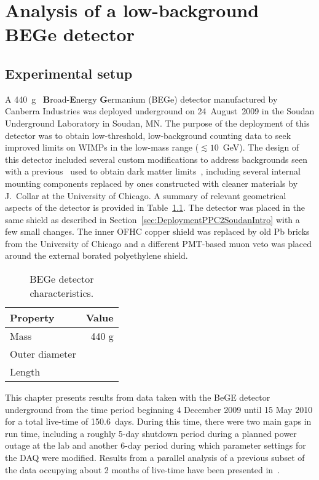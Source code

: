 \chapter{Analysis of a low-background BEGe detector}
\label{chap:AnalysisBeGe}
	\section{Experimental setup}
	\label{sec:BeGeExperimentalSetup}

A 440~g \ppc~\textbf{B}road-\textbf{E}nergy \textbf{G}ermanium (BEGe) detector manufactured by Canberra Industries was deployed underground on 24~August~2009 in the Soudan Underground Laboratory in Soudan, MN.  The purpose of the deployment of this detector was to obtain low-threshold, low-background counting data to seek improved limits on WIMPs in the low-mass range ($\lesssim10$~GeV).  The design of this detector included several custom modifications to address backgrounds seen with a previous \ppc~used to obtain dark matter limits~\cite{Aalseth:2008aa}, including several internal mounting components replaced by ones constructed with cleaner materials by J.~Collar at the University of Chicago.  A summary of relevant geometrical aspects of the detector is provided in Table~\ref{tab:BEGeCharacteristics}.
The detector was placed in the same shield as described in Section~\ref{sec:DeploymentPPC2SoudanIntro} with a few small changes.  The inner OFHC copper shield was replaced by old Pb bricks from the University of Chicago and a different PMT-based muon veto was placed around the external borated polyethylene shield.   %

			\begin{table}
				\centering
				\begin{tabular}{l r}
					\toprule
					Property & Value \\
					\midrule
					Mass & 440 g \\
					Outer diameter &  \\
					Length &  \\
					\bottomrule
				\end{tabular}
				\caption[BEGe detector characteristics]
				{BEGe detector characteristics.  }
				\label{tab:BEGeCharacteristics}
			\end{table}

This chapter presents results from data taken with the BeGE detector underground from the time period beginning 4 December 2009 until 15 May 2010 for a total live-time of 150.6~days.  During this time, there were two main gaps in run time, including a roughly 5-day shutdown period during a planned power outage at the lab and another 6-day period during which parameter settings for the DAQ were modified.  Results from a parallel analysis of a previous subset of the data occupying about 2 months of live-time have been presented in~\cite{Aalseth:2010aa}.

